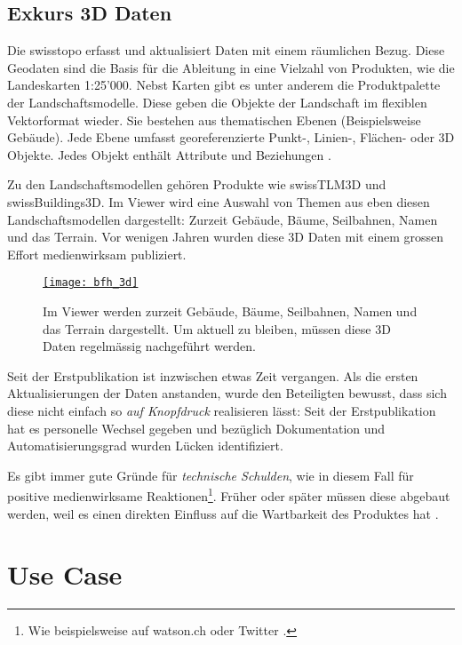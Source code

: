 \newpage

\subsection{Exkurs 3D Daten}
Die swisstopo erfasst und aktualisiert Daten mit einem räumlichen Bezug. Diese Geodaten sind die Basis für die Ableitung in eine Vielzahl von Produkten, wie die Landeskarten 1:25'000. Nebst Karten gibt es unter anderem die Produktpalette der Landschaftsmodelle. Diese geben die Objekte der Landschaft im flexiblen Vektorformat wieder. Sie bestehen aus thematischen Ebenen (Beispielsweise Gebäude). Jede Ebene umfasst georeferenzierte Punkt-, Linien-, Flächen- oder 3D Objekte. Jedes Objekt enthält Attribute und Beziehungen \cite{toposhop2010}.

Zu den Landschaftsmodellen gehören Produkte wie swissTLM3D und swissBuildings3D. Im Viewer wird eine Auswahl von Themen aus eben diesen Landschaftsmodellen dargestellt: Zurzeit Gebäude, Bäume, Seilbahnen, Namen und das Terrain. Vor wenigen Jahren wurden diese 3D Daten mit einem grossen Effort medienwirksam publiziert.

\begin{figure}[H]
	\centering
	\href{https://s.geo.admin.ch/8a8ce63073}{
	\texttt{[image: bfh\_3d]}}
	\caption{Im Viewer werden zurzeit Gebäude, Bäume, Seilbahnen, Namen und das Terrain dargestellt. Um aktuell zu bleiben, müssen diese 3D Daten regelmässig nachgeführt werden.}
	\label{fig:bfh_3d}
\end{figure}

Seit der Erstpublikation ist inzwischen etwas Zeit vergangen. Als die ersten Aktualisierungen der Daten anstanden, wurde den Beteiligten bewusst, dass sich diese nicht einfach so \emph{auf Knopfdruck} realisieren lässt: Seit der Erstpublikation hat es personelle Wechsel gegeben und bezüglich Dokumentation und Automatisierungsgrad wurden Lücken identifiziert.

Es gibt immer gute Gründe für \emph{technische Schulden}, wie in diesem Fall für positive medienwirksame Reaktionen\footnote{Wie beispielsweise auf watson.ch oder Twitter \cite{watson2018}.}. Früher oder später müssen diese abgebaut werden, weil es einen direkten Einfluss auf die Wartbarkeit des Produktes hat \cite{technischeschulden2010}.

\section{Use Case}
